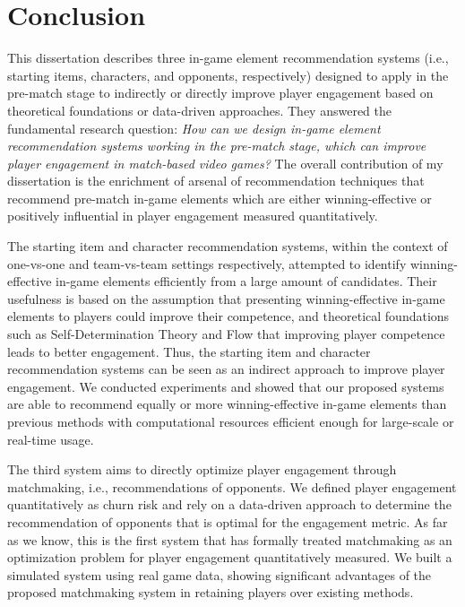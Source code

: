 \chapter{Conclusion} %

\label{chapter:conclusion} 

This dissertation describes three in-game element recommendation systems (i.e., starting items, characters, and opponents, respectively) designed to apply in the pre-match stage to indirectly or directly improve player engagement based on theoretical foundations or data-driven approaches. They answered the fundamental research question: \textit{How can we design in-game element recommendation systems working in the pre-match stage, which can improve player engagement in match-based video games?} The overall contribution of my dissertation is the enrichment of arsenal of recommendation techniques that recommend  pre-match in-game elements which are either winning-effective or positively influential in player engagement measured  quantitatively.

The starting item and character recommendation systems, within the context of one-vs-one and team-vs-team settings respectively, attempted to identify winning-effective in-game elements efficiently from a large amount of candidates. Their usefulness is based on the assumption that presenting winning-effective in-game elements to players could improve their competence, and theoretical foundations such as Self-Determination Theory and Flow that improving player competence leads to better engagement. Thus, the starting item and character recommendation systems can be seen as an indirect approach to improve player engagement. We conducted experiments and showed that our proposed systems are able to recommend equally or more winning-effective in-game elements than previous methods with computational resources efficient enough for large-scale or real-time usage. 

The third system aims to directly optimize player engagement through matchmaking, i.e., recommendations of opponents. We defined player engagement quantitatively as churn risk and rely on a data-driven approach to determine the recommendation of opponents that is optimal for  the engagement metric. As far as we know, this is the first system that has formally treated matchmaking as an optimization problem for player engagement quantitatively measured. We built a simulated system using real game data, showing significant advantages of the proposed matchmaking system in retaining players over existing methods.


